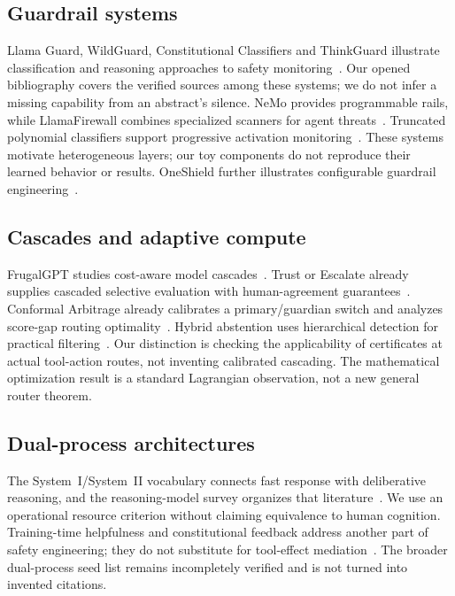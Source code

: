 ﻿\documentclass[lettersize,journal]{IEEEtran}
\begin{document}
\subsection{Guardrail systems}
Llama Guard, WildGuard, Constitutional Classifiers and ThinkGuard
illustrate classification and reasoning approaches to safety
monitoring~\cite{arxiv231206674,arxiv240618495,arxiv250118837,arxiv250213458}.
Our opened bibliography covers the verified sources among these systems;
we do not infer a missing capability from an abstract's silence.
NeMo provides programmable rails, while LlamaFirewall combines specialized
scanners for agent threats~\cite{arxiv231010501,arxiv250503574}.
Truncated polynomial classifiers support progressive activation
monitoring~\cite{arxiv250926238}. These systems motivate heterogeneous layers;
our toy components do not reproduce their learned behavior or results.
OneShield further illustrates configurable guardrail
engineering~\cite{arxiv250721170}.

\subsection{Cascades and adaptive compute}
FrugalGPT studies cost-aware model cascades~\cite{arxiv230505176}.
Trust or Escalate already supplies cascaded selective evaluation with
human-agreement guarantees~\cite{arxiv240718370}. Conformal Arbitrage already
calibrates a primary/guardian switch and analyzes score-gap routing
optimality~\cite{arxiv250600911}. Hybrid abstention uses hierarchical detection
for practical filtering~\cite{arxiv260215391}. Our distinction is checking
the applicability of certificates at actual tool-action routes, not inventing
calibrated cascading. The mathematical optimization result is a standard
Lagrangian observation, not a new general router theorem.

\subsection{Dual-process architectures}
The System~I/System~II vocabulary connects fast response with deliberative
reasoning, and the reasoning-model survey organizes that
literature~\cite{arxiv250217419}. We use an operational resource criterion
without claiming equivalence to human cognition. Training-time helpfulness
and constitutional feedback address another part of safety engineering;
they do not substitute for tool-effect mediation~\cite{arxiv220405862,arxiv221208073}.
The broader dual-process seed list remains incompletely verified and is not
turned into invented citations.
\end{document}
